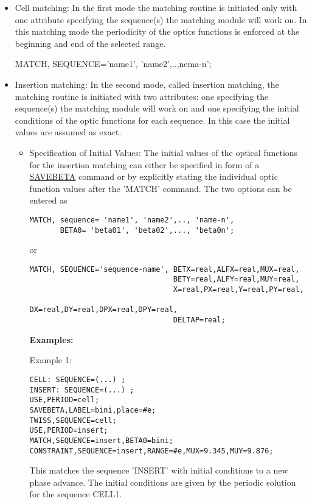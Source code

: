 \begin{itemize}
	\item Cell matching:
In the first mode the matching routine is initiated only with one
attribute specifying the sequence(s) the matching module will work
on. In this matching mode the periodicity of the optics functions is
enforced at the beginning and end of the selected range. 

MATCH, SEQUENCE='name1', 'name2',..,nema-n';
 
	\item Insertion matching:
In the second mode, called insertion matching, the matching routine is
initiated with two attributes: one specifying the sequence(s) the
matching module will work on and one specifying the initial conditions
of the optic functions for each sequence. In this case the initial
values are assumed as exact. 
 
\begin{itemize}
	\item 
Specification of Initial Values: The initial values of the optical
functions  for the insertion matching can either be specified in form of
a \href{../control/general.html#savebeta}{SAVEBETA} command or by
explicitly stating the individual optic function values after the
'MATCH' command. The two options can be entered as 
 
\begin{verbatim}
MATCH, sequence= 'name1', 'name2',.., 'name-n',
       BETA0= 'beta01', 'beta02',..., 'beta0n';
\end{verbatim}
or
\begin{verbatim}
MATCH, SEQUENCE='sequence-name', BETX=real,ALFX=real,MUX=real,
                                 BETY=real,ALFY=real,MUY=real,
                                 X=real,PX=real,Y=real,PY=real,
                                 DX=real,DY=real,DPX=real,DPY=real,
                                 DELTAP=real;
\end{verbatim}

{\bf Examples:}
 
Example 1:
\begin{verbatim}
CELL: SEQUENCE=(...) ;
INSERT: SEQUENCE=(...) ;
USE,PERIOD=cell;
SAVEBETA,LABEL=bini,place=#e;
TWISS,SEQUENCE=cell;
USE,PERIOD=insert;
MATCH,SEQUENCE=insert,BETA0=bini;
CONSTRAINT,SEQUENCE=insert,RANGE=#e,MUX=9.345,MUY=9.876;
\end{verbatim}
This matches the sequence 'INSERT' with initial conditions to a new
phase advance. The initial conditions are given by the periodic solution
for the sequence CELL1. 


\end{itemize}
\end{itemize}
